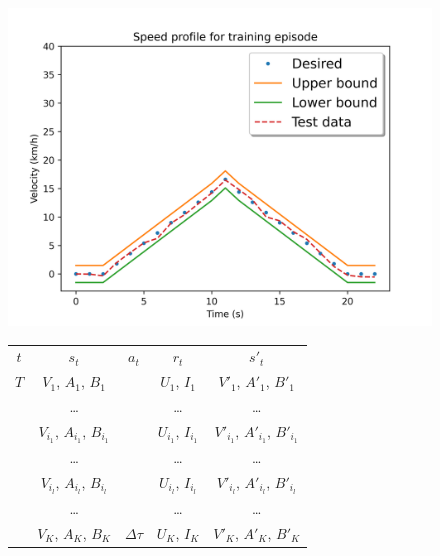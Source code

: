 \documentclass{article}
\begin{document}
\begin{figure}
	\begin{minipage}[b]{0.5\linewidth}
		\centering
		\includegraphics[scale=0.5]{images/speed_profile.png}
	\end{minipage}
	\quad
	\begin{minipage}[b]{0.45\linewidth}
		\centering
		\begin{tabular}{c c c c c}
			\toprule
			$t$ & $s_{t}$                               & $a_t$         & $r_t$                    & $s'_t$                                   \\
			\cmidrule(r){1-1} \cmidrule(r){2-4} \cmidrule{5-5}
			$T$ & $V_1$, $A_1$, $B_1$                   &               & $U_{1}$, $I_{1}$         & $V'_1$, $A'_1$, $B'_1$                   \\
			    & \ldots                                &               & \ldots                   & \ldots                                   \\
			    & $V_{i_{1}}$, $A_{i_{1}}$, $B_{i_{1}}$ &               & $U_{i_{1}}$, $I_{i_{1}}$ & $V'_{i_{1}}$, $A'_{i_{1}}$, $B'_{i_{1}}$ \\
			    & \ldots                                &               & \ldots                   & \ldots                                   \\
			    & $V_{i_{l}}$, $A_{i_l}$, $B_{i_l}$     &               & $U_{i_{l}}$, $I_{i_{l}}$ & $V'_{i_{l}}$, $A'_{i_{l}}$, $B'_{i_{l}}$ \\
			    & \ldots                                &               & \ldots                   & \ldots                                   \\
			    & $V_K$, $A_K$, $B_K$                   & $\Delta \tau$ & $U_K$, $I_K$             & $V'_K$, $A'_K$, $B'_K$                   \\
			\bottomrule
		\end{tabular}
	\end{minipage}\hfill
\end{figure}
\end{document}
